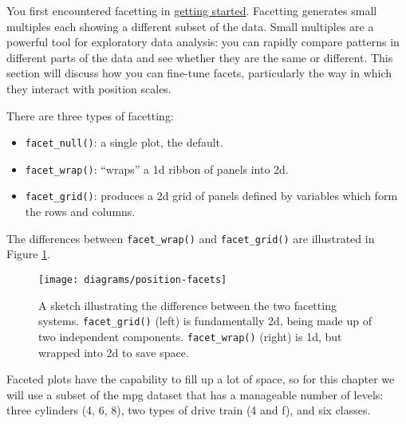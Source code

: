 You first encountered facetting in
\protect\hyperlink{sec:qplot-facetting}{getting started}. Facetting
generates small multiples each showing a different subset of the data.
Small multiples are a powerful tool for exploratory data analysis: you
can rapidly compare patterns in different parts of the data and see
whether they are the same or different. This section will discuss how
you can fine-tune facets, particularly the way in which they interact
with position scales.  

There are three types of facetting:

\begin{itemize}
\item
  \texttt{facet\_null()}: a single plot, the default.
\item
  \texttt{facet\_wrap()}: ``wraps'' a 1d ribbon of panels into 2d.
\item
  \texttt{facet\_grid()}: produces a 2d grid of panels defined by
  variables which form the rows and columns.
\end{itemize}

The differences between \texttt{facet\_wrap()} and
\texttt{facet\_grid()} are illustrated in Figure \ref{fig:facet-sketch}.

\begin{figure}[htbp]
  \centering
    \texttt{[image: diagrams/position-facets]}
  \caption{A sketch illustrating the difference between the two facetting systems. \texttt{facet\_grid()} (left) is fundamentally 2d, being made up of two independent components. \texttt{facet\_wrap()} (right) is 1d, but wrapped into 2d to save space.}
  \label{fig:facet-sketch}
\end{figure}

Faceted plots have the capability to fill up a lot of space, so for this
chapter we will use a subset of the mpg dataset that has a manageable
number of levels: three cylinders (4, 6, 8), two types of drive train (4
and f), and six classes.

\begin{Shaded}
\end{Shaded}

